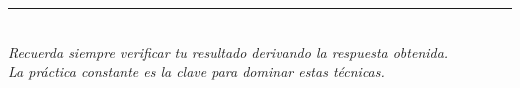 \documentclass[12pt, letterpaper]{article}
\begin{document}
\vspace{8pt}

\begin{center}
  \color{mwprimario}\rule{0.55\linewidth}{0.8pt}\\[4pt]
  \small\color{gray}
  \textit{Recuerda siempre verificar tu resultado derivando la respuesta obtenida.}\\[2pt]
  \textit{La práctica constante es la clave para dominar estas técnicas.}
\end{center}

\fi
\end{document}
